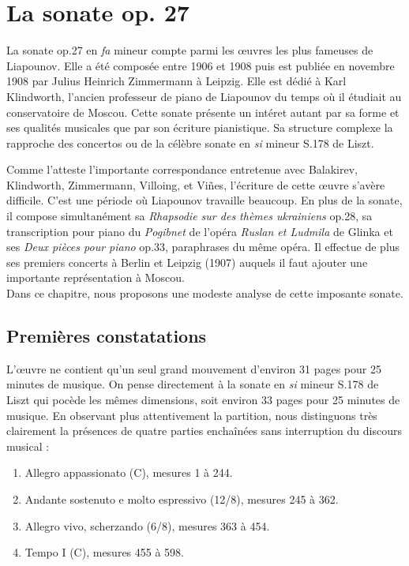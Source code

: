 
\chapter{La sonate op. 27}

La sonate op.27 en \emph{fa} mineur compte parmi les œuvres les plus fameuses de Liapounov. Elle a été composée entre 1906 et 1908 puis est publiée en novembre 1908 par Julius Heinrich Zimmermann à Leipzig. Elle est dédié à Karl Klindworth, l'ancien professeur de piano de Liapounov du temps où il étudiait au conservatoire de Moscou. Cette sonate présente un intéret autant par sa forme et ses qualités musicales que par son écriture pianistique. Sa structure complexe la rapproche des concertos ou de la célèbre sonate en \emph{si} mineur S.178 de Liszt.

Comme l'atteste l'importante correspondance entretenue avec Balakirev, Klindworth, Zimmermann, Villoing, et Viñes, l'écriture de cette œuvre s'avère difficile. C'est une période où Liapounov travaille beaucoup. En plus de la sonate, il compose simultanément sa \emph{Rhapsodie sur des thèmes ukrainiens} op.28, sa transcription pour piano du \emph{Pogibnet} de l'opéra \emph{Ruslan et Ludmila} de Glinka et ses \emph{Deux pièces pour piano} op.33, paraphrases du même opéra. Il effectue de plus ses premiers concerts à Berlin et Leipzig (1907) auquels il faut ajouter une importante représentation à Moscou.\\

Dans ce chapitre, nous proposons une modeste analyse de cette imposante sonate.

\section{Premières constatations}

L'œuvre ne contient qu'un seul grand mouvement d'environ 31 pages pour 25 minutes de musique. On pense directement à la sonate en \emph{si} mineur S.178 de Liszt qui pocède les mêmes dimensions, soit environ 33 pages pour 25 minutes de musique. En observant plus attentivement la partition, nous distinguons très clairement la présences de quatre parties enchaînées sans interruption du discours musical :
\begin{enumerate}
  \item Allegro appassionato (C), mesures 1 à 244.
  \item Andante sostenuto e molto espressivo (12/8), mesures 245 à 362.
  \item Allegro vivo, scherzando (6/8), mesures 363 à 454.
  \item Tempo I (C), mesures 455 à 598.\\
\end{enumerate}

